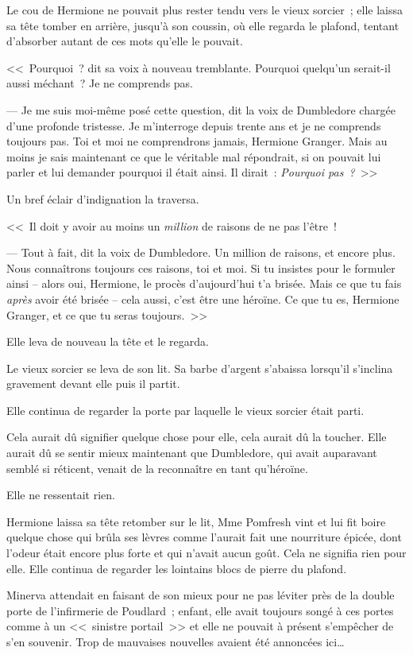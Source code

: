 Le cou de Hermione ne pouvait plus rester tendu vers le vieux sorcier~; elle laissa sa tête tomber en arrière, jusqu'à son coussin, où elle regarda le plafond, tentant d'absorber autant de ces mots qu'elle le pouvait.

<<~Pourquoi~? dit sa voix à nouveau tremblante. Pourquoi quelqu'un serait-il aussi méchant~? Je ne comprends pas.

--- Je me suis moi-même posé cette question, dit la voix de Dumbledore chargée d'une profonde tristesse. Je m'interroge depuis trente ans et je ne comprends toujours pas. Toi et moi ne comprendrons jamais, Hermione Granger. Mais au moins je sais maintenant ce que le véritable mal répondrait, si on pouvait lui parler et lui demander pourquoi il était ainsi. Il dirait~: \emph{Pourquoi pas~?}~>>

Un bref éclair d'indignation la traversa.

<<~Il doit y avoir au moins un \emph{million} de raisons de ne pas l'être~!

--- Tout à fait, dit la voix de Dumbledore. Un million de raisons, et encore plus. Nous connaîtrons toujours ces raisons, toi et moi. Si tu insistes pour le formuler ainsi -- alors oui, Hermione, le procès d'aujourd'hui t'a brisée. Mais ce que tu fais \emph{après} avoir été brisée -- cela aussi, c'est être une héroïne. Ce que tu es, Hermione Granger, et ce que tu seras toujours.~>>

Elle leva de nouveau la tête et le regarda.

Le vieux sorcier se leva de son lit. Sa barbe d'argent s'abaissa lorsqu'il s'inclina gravement devant elle puis il partit.

Elle continua de regarder la porte par laquelle le vieux sorcier était parti.

Cela aurait dû signifier quelque chose pour elle, cela aurait dû la toucher. Elle aurait dû se sentir mieux maintenant que Dumbledore, qui avait auparavant semblé si réticent, venait de la reconnaître en tant qu'héroïne.

Elle ne ressentait rien.

Hermione laissa sa tête retomber sur le lit, Mme Pomfresh vint et lui fit boire quelque chose qui brûla ses lèvres comme l'aurait fait une nourriture épicée, dont l'odeur était encore plus forte et qui n'avait aucun goût. Cela ne signifia rien pour elle. Elle continua de regarder les lointains blocs de pierre du plafond.

\later

Minerva attendait en faisant de son mieux pour ne pas léviter près de la double porte de l'infirmerie de Poudlard~; enfant, elle avait toujours songé à ces portes comme à un <<~sinistre portail~>> et elle ne pouvait à présent s'empêcher de s'en souvenir. Trop de mauvaises nouvelles avaient été annoncées ici…


